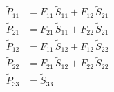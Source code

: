 \begin{align}
\tilde{P}_{11} &= F_{11}\,\tilde{S}_{11}+F_{12}\,\tilde{S}_{21} \\ 
\tilde{P}_{21} &= F_{21}\,\tilde{S}_{11}+F_{22}\,\tilde{S}_{21} \\ 
\tilde{P}_{12} &= F_{11}\,\tilde{S}_{12}+F_{12}\,\tilde{S}_{22} \\ 
\tilde{P}_{22} &= F_{21}\,\tilde{S}_{12}+F_{22}\,\tilde{S}_{22} \\ 
\tilde{P}_{33} &= \tilde{S}_{33} 
\end{align}
